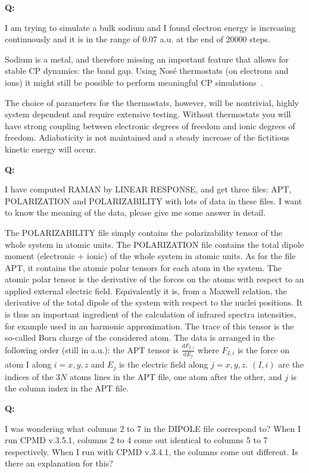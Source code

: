\documentclass[twoside,10pt,titlepage,a4paper]{article}
\newcommand{\reflabel}[1]{\hypertarget{#1}}
\newcommand{\reflabel}[1]{\label{#1}}
\newcommand{\faqquestion}[1]{\vspace{2ex}\reflabel{faq#1}{{\bf Q:\ }}}
\newcommand{\faqanswer}{\vspace{1ex}{{\bf A:\ }}}
\begin{document}
\faqquestion{eneele}
I am trying to simulate a bulk sodium and
I found electron energy is increasing
continuously and it is in the range of 0.07 a.u. at
the end of 20000 steps.

\faqanswer
Sodium is a metal, and therefore missing an important
feature that allows for stable CP dynamics: the band gap.
Using Nos\'{e} thermostats (on electrons and ions) it
might still be possible to perform meaningful CP
simulations~\cite{Blochl92}.

The choice of parameters for the thermostats, however,
will be nontrivial, highly system dependent and require
extensive testing.
Without thermostats you will have strong coupling between
electronic degrees of freedom and ionic degrees of freedom.
Adiabaticity is not maintained and a steady increase of the
fictitious kinetic energy will occur.
%


\faqquestion{raman}
I have computed RAMAN by LINEAR RESPONSE, and get three files: APT,
POLARIZATION and POLARIZABILITY with lots of data in these files. I
want to know the meaning of the data, please give me some answer in
detail. 

\faqanswer
The POLARIZABILITY file simply contains the polarizability tensor of the
whole system in atomic units. The POLARIZATION file contains the
total dipole moment (electronic + ionic) of the
whole system in atomic units. As for the file APT, it contains the
atomic polar tensors for each atom in the system.  The atomic polar
tensor is the derivative of the forces on the atoms with respect to an
applied external electric field. Equivalently it is, from a Maxwell
relation, the derivative of the total dipole of the system with respect
to the nuclei positions. It is thus an important ingredient of the
calculation of infrared spectra intensities, for example used in an
harmonic approximation. The trace of this tensor is the so-called Born
charge of the considered atom.  The data is arranged in the following
order (still in a.u.): the APT tensor is
$\frac{\mathrm{d}F_{I,i}}{\mathrm{d}E_{j}}$ where $F_{I,i}$ is the force
on atom I along $i=x,y,z$ and $E_j$ is the electric field along
$j=x,y,z$. $(I,i)$ are the indices of the $3N$ atoms lines in the APT
file, one atom after the other, and $j$ is the column index in the APT
file.

\faqquestion{dipole}
I was wondering what columns 2 to 7 in the DIPOLE file correspond to?
When I run CPMD v.3.5.1, columns 2 to 4 come out identical to columns
5 to 7 respectively. When I run with CPMD v.3.4.1, the columns
come out different. Is there an explanation for this?
\end{document}
